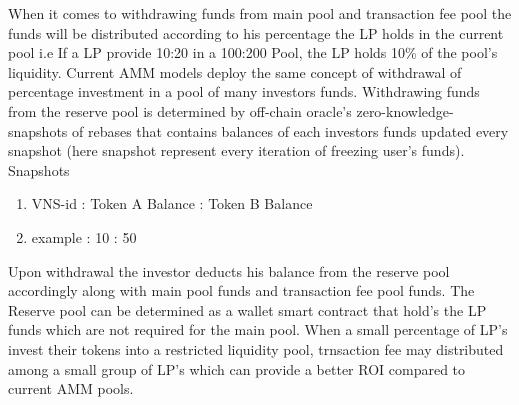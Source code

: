 \documentclass[letterpaper,11pt]{article}
\begin{document}
When it comes to withdrawing funds from main pool and transaction fee pool the funds will be distributed according to his percentage the LP holds in the current pool i.e If a LP provide 10:20 in a 100:200 Pool, the LP holds 10\% of the pool's liquidity. Current AMM models deploy the same concept of withdrawal of percentage investment in a pool of many investors funds. Withdrawing funds from the reserve pool is determined by off-chain oracle's zero-knowledge-snapshots of rebases that contains balances of each investors funds updated every snapshot (here snapshot represent every iteration of freezing user's funds). \\

Snapshots
\begin{enumerate}[wide, labelwidth=!, labelindent=0pt]
\item VNS-id : Token A Balance : Token B Balance
\item example : 10 : 50
\end{enumerate}

Upon withdrawal the investor deducts his balance from the reserve pool accordingly along with main pool funds and transaction fee pool funds. The Reserve pool can be determined as a wallet smart contract that hold's the LP funds which are not required for the main pool. When a small percentage of LP's invest their tokens into a restricted liquidity pool, trnsaction fee may distributed among a small group of LP's which can provide a better ROI compared to current AMM pools.
\end{document}
